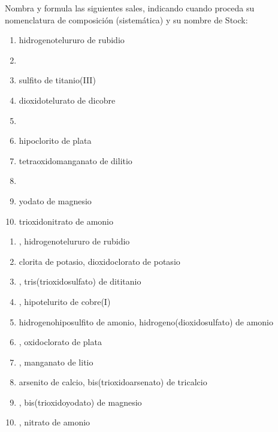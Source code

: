 \begin{exercise}[
    tags    = {inorgánica,sales,sales binarias,sales ternarias},
    topics  = {química inorgánica,formulación,nomenclatura},
    source  = {SAN Formulación, p29, e39},
  ]
  Nombra y formula las siguientes sales, indicando cuando proceda su nomenclatura de composición (sistemática) y su nombre de Stock:

  \begin{enumerate}
    \item hidrogenotelururo de rubidio
    \item {}
    \item sulfito de titanio(III)
    \item dioxidotelurato de dicobre
    \item {}
    \item hipoclorito de plata
    \item tetraoxidomanganato de dilitio
    \item {}
    \item yodato de magnesio
    \item trioxidonitrato de amonio
  \end{enumerate}
\end{exercise}

\begin{solution}
  \begin{enumerate}
    \item {}, hidrogenotelururo de rubidio
    \item clorita de potasio, dioxidoclorato de potasio
    \item {}, tris(trioxidosulfato) de dititanio
    \item {}, hipotelurito de cobre(I)
    \item hidrogenohiposulfito de amonio, hidrogeno(dioxidosulfato) de amonio
    \item {}, oxidoclorato de plata
    \item {}, manganato de litio
    \item arsenito de calcio, bis(trioxidoarsenato) de tricalcio
    \item {}, bis(trioxidoyodato) de magnesio
    \item {}, nitrato de amonio
  \end{enumerate}
\end{solution}




